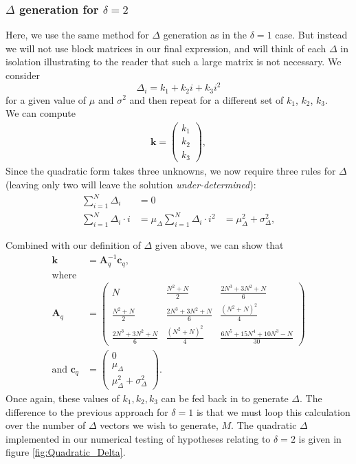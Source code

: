 \documentclass[10pt,journal,compsoc]{IEEEtran}
\begin{document}
\subsubsection{$\Delta$ generation for $\delta=2$}\label{sect:delta_gen_2}

Here, we use the same method for $\Delta$ generation as in the $\delta=1$ case. But instead we will not use block matrices in our final expression, and will think of each $\Delta$ in isolation illustrating to the reader that such a large matrix is not necessary.
We consider $$\Delta_i = k_1+k_2i+k_3i^2$$ for a given value of $\mu$ and $\sigma^2$ and then repeat for a different set of $k_1$, $k_2$, $k_3$.\\
We can compute 
\begin{align*}
    \boldsymbol{k} = \begin{pmatrix}
           k_1 \\
           k_2 \\
           k_3
         \end{pmatrix},
\end{align*}
Since the quadratic form takes three unknowns, we now require three rules for $\Delta$ (leaving only two will leave the solution \textit{under-determined}):
\begin{align}
    \sum_{i=1}^N\Delta_i &= 0 \label{eq:cons_of_prob_2}\\
    \sum_{i=1}^N\Delta_i \cdot i &= \mu_{\Delta} \label{eq:mean_2}
    \sum_{i=1}^N\Delta_i \cdot i^2 &= \mu_{\Delta}^2 + \sigma_{\Delta}^2 \label{eq:variance_Delta},
\end{align}

  Combined with our definition of $\Delta$ given above, we can show that
\begin{align*}
\boldsymbol{k} &= \boldsymbol{A}_q^{-1}\boldsymbol{c}_q,\\\text{where} \\
\boldsymbol{A}_q &= 
\begin{pmatrix}
N & \frac{N^2+N}{2} & \frac{2N^3+3N^2+N}{6}\\
\frac{N^2+N}{2} & \frac{2N^3+3N^2+N}{6} & \frac{(N^2+N)^2}{4}\\
\frac{2N^3+3N^2+N}{6} & \frac{(N^2+N)^2}{4} & \frac{6N^5+15N^4+10N^3-N}{30}
\end{pmatrix}\\
\text{and }
\boldsymbol{c}_q &= \begin{pmatrix}
0 \\
\mu_{\Delta}\\
\mu_{\Delta}^2 +\sigma_{\Delta}^2
\end{pmatrix}.
\end{align*}
Once again, these values of $k_1, k_2, k_3$ can be fed back in to generate $\Delta$. The difference to the previous approach for $\delta=1$ is that we must loop this calculation over the number of $\Delta$ vectors we wish to generate, $M$. The quadratic $\Delta$ implemented in our numerical testing of hypotheses relating to $\delta=2$ is given in figure \ref{fig:Quadratic_Delta}.
\end{document}
